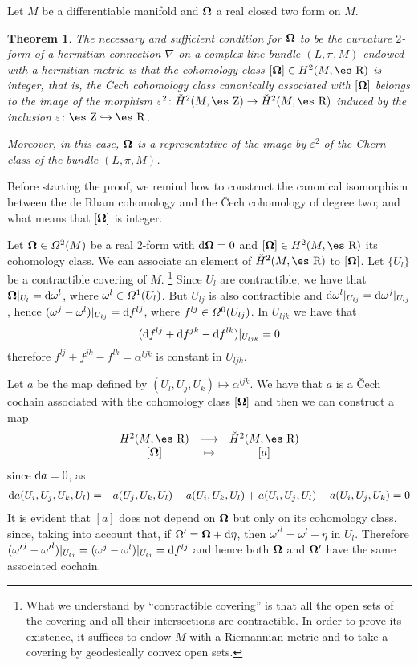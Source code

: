 \documentclass[12pt]{article}
\theoremstyle{plain}
\newtheorem{teor}{Theorem}
\def\beann{\begin{eqnarray*}}
\def\eeann{\end{eqnarray*}}
\def\d{{\rm d}}
\def\curv{{\bf \Omega}}
\def\Zahl{\mbox{\es Z}}
\def\Real{\mbox{\es R}}
\begin{document}
Let $M$ be a differentiable manifold and $\curv $ a real closed two form
on $M$.

\begin{teor}
The necessary and sufficient condition for $\curv $ to be the curvature
$2$-form
of a hermitian connection $\nabla$ on a complex line bundle $(L,\pi ,M)$
endowed with a hermitian metric is that the cohomology class
$[\curv ] \in H^2(M,\Real )$ is integer, that is, the \v{C}ech
cohomology class
canonically associated with $[\curv ]$ belongs to the image of the
morphism
$\varepsilon^2 \colon \check{H}^2(M,\Zahl ) \to \check{H}^2(M,\Real )$
induced by the inclusion $\varepsilon \colon \Zahl \hookrightarrow
\Real$.

Moreover, in this case, $\curv $ is a representative of the image by
$\varepsilon^2$
of the Chern class of the bundle $(L,\pi ,M)$.
\label{cce}
\end{teor}

Before starting the proof, we remind how to construct
the canonical isomorphism between the
de Rham cohomology and the \v{C}ech cohomology
of degree two; and what means that $[\curv ]$ is integer.

Let $\curv  \in {\mit\Omega}^2(M)$ be
a real $2$-form with $\d\curv  = 0$ and
$[\curv ] \in H^2(M,\Real )$ its cohomology class.
We can associate an element of $\check{H}^2(M,\Real )$ to $[\curv ]$.
Let $\{ U_l \}$ be a contractible covering of $M$.%
\footnote
{What we understand by ``contractible covering'' is that
all the open sets of the covering
and all their intersections are contractible.
In order to prove its existence, it suffices to endow $M$ with a
Riemannian metric and to take a
covering by geodesically convex open sets.}
Since $U_l$ are contractible, we have that
$\curv  \vert_{U_l} = \d \omega^l $,
where $\omega^l  \in {\mit\Omega}^1(U_l)$.
But $U_{l j}$ is also contractible and
$\d\omega^l  \vert_{U_{l j}} = \d\omega^j \vert_{U_{l j}}$,
hence $(\omega^j - \omega^l )\vert_{U_{l j}} = \d f^{l j}$,
where $f^{l j} \in {\mit\Omega}^0(U_{l j})$. In $U_{l jk}$ we have that
$$
(\d f^{l j} + \d f^{jk} - \d f^{l k})\vert_{U_{l jk}} =0
$$
therefore $f^{l j} + f^{jk} - f^{l k} = \alpha^{l jk}$ is constant in
$U_{l jk}$.

Let $a$ be the map defined by
$(U_l,U_j,U_k) \mapsto \alpha^{l jk}$.
We have that $a$ is a \v{C}ech cochain associated with the
cohomology class $[\curv ]$ and then we can construct a map
$$
\begin{array}{ccc}
H^2(M,\Real ) & \longrightarrow & \check{H}^2(M,\Real )
\nopagebreak
\\ {}
[\curv ] & \mapsto & [a]
\end{array}
$$
since $\d a = 0$, as
\beann
\d a (U_i,U_j,U_k,U_l)
&=&
a(U_j,U_k,U_l) - a(U_i,U_k,U_l) + a(U_i,U_j,U_l) - a(U_i,U_j,U_k) = 0
\eeann
It is evident that $[a]$ does not depend
on $\curv $ but only on its cohomology class,
since, taking into account that, if $\Omega' = \curv  + \d \eta$,
then ${\omega'}^l = \omega^l  + \eta$ in $U_l$. Therefore
$({\omega'}^j - {\omega'}^l)\vert_{U_{l j}} =
(\omega^j - \omega^l )\vert_{U_{l j}} = \d f^{l j}$
and hence both $\curv $ and ${\bf \Omega'}$
have the same associated cochain.
\end{document}

